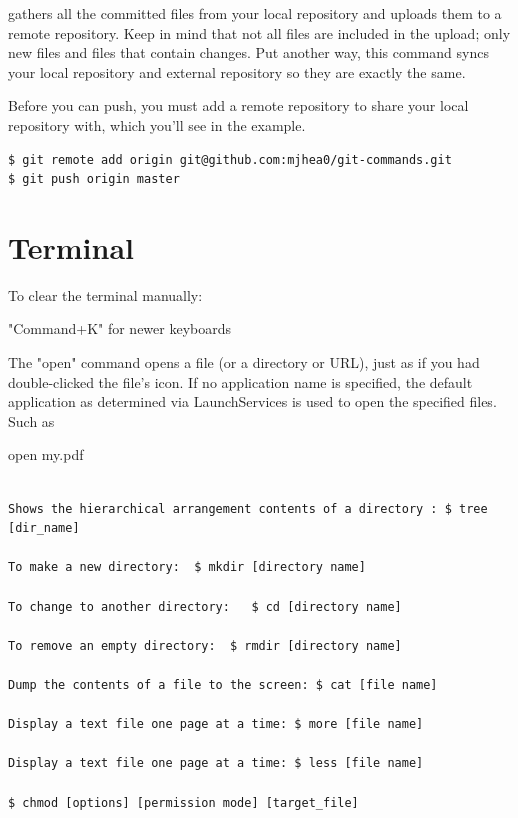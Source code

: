 gathers all the committed files from your local repository and uploads them to a remote repository. Keep in mind that not all files are included in the upload; only new files and files that contain changes. Put another way, this command syncs your local repository and external repository so they are exactly the same.

Before you can push, you must add a remote repository to share your local repository with, which you’ll see in the example.

\begin{verbatim}
$ git remote add origin git@github.com:mjhea0/git-commands.git
$ git push origin master
\end{verbatim}










\section{Terminal}

To clear the terminal manually:


"Command+K"  for newer keyboards


The "open" command opens a file (or a directory or URL), just as if you had double-clicked the file's icon. If no application name is specified, the default application as determined via LaunchServices is used to open the specified files. Such as

open my.pdf

\begin{verbatim}

Shows the hierarchical arrangement contents of a directory : $ tree [dir_name]

To make a new directory:  $ mkdir [directory name]

To change to another directory:   $ cd [directory name]

To remove an empty directory:  $ rmdir [directory name]

Dump the contents of a file to the screen: $ cat [file name]

Display a text file one page at a time: $ more [file name]

Display a text file one page at a time: $ less [file name]

$ chmod [options] [permission mode] [target_file]


\end{verbatim}


